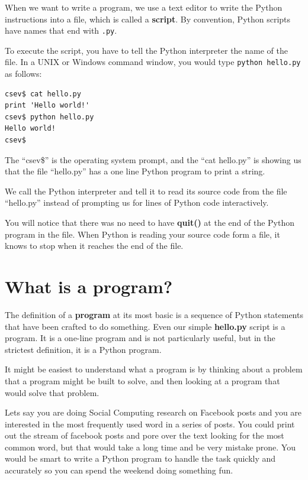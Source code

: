 \documentclass[11pt]{book}
\begin{document}
When we want to write a program, 
we use a text editor to write the Python instructions into a file,
which is called a {\bf script}.  By
convention, Python scripts have names that end with {\tt .py}.


To execute the script, you have to tell the Python interpreter 
the name of the file.  In a UNIX or Windows command window, 
you would type {\tt python hello.py} as follows:

\beforeverb
\begin{verbatim}
csev$ cat hello.py
print 'Hello world!'
csev$ python hello.py
Hello world!
csev$
\end{verbatim}
\afterverb
%
The ``csev\$'' is the operating system prompt, and the ``cat hello.py'' is 
showing us that the file ``hello.py'' has a one line Python program to print
a string.

We call the Python interpreter and tell it to read its source code from
the file ``hello.py'' instead of prompting us for lines of Python code
interactively.

You will notice that there was no need to have {\bf quit()} at the end of
the Python program in the file.   When Python is reading your source code
form a file, it knows to stop when it reaches the end of the file.

\section{What is a program?}

The definition of a {\bf program} at its most basic is a sequence
of Python statements that have been crafted to do something.
Even our simple {\bf hello.py} script is a program.  It is a one-line
program and is not particularly useful, but in the strictest definition,
it is a Python program.

It might be easiest to understand what a program is by thinking about a problem 
that a program might be built to solve, and then looking at a program
that would solve that problem.

Lets say you are doing Social Computing research on Facebook posts and 
you are interested in the most frequently used word in a series of posts.
You could print out the stream of facebook posts and pore over the text
looking for the most common word, but that would take a long time and be very 
mistake prone.  You would be smart to write a Python program to handle the
task quickly and accurately so you can spend the weekend doing something 
fun.
\end{document}
